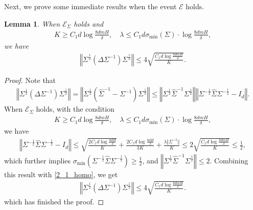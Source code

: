\documentclass{article}
\newtheorem{lemma}{Lemma}[section]
\numberwithin{equation}{section}
\begin{document}
Next, we prove some immediate results when the event $\mathcal{E}$ holds. 
\begin{lemma}
\label{dsig2_homo}
When $\mathcal{E}_\Sigma$ holds and 
\begin{align*}
    K\geq C_1d\log\frac{8dmH}{\delta},\quad\lambda\leq C_1d\sigma_{\textrm{min}}(\Sigma)\cdot\log\frac{8dmH}{\delta},
\end{align*}
we have
\begin{align*}
        \left\Vert\Sigma^{\frac{1}{2}}\left(\Delta\Sigma^{-1}\right)\Sigma^{\frac{1}{2}}\right\Vert\leq 4\sqrt{\frac{C_1d\log\frac{8dmH}{\delta}}{K}}. 
\end{align*}
\end{lemma}
\begin{proof}
Note that
\begin{align}
    \label{2_1_homo}
    \left\Vert\Sigma^{\frac{1}{2}}\left(\Delta\Sigma^{-1}\right)\Sigma^{\frac{1}{2}}\right\Vert=\left\Vert\Sigma^{\frac{1}{2}}\left(\widehat{\Sigma}^{-1}-\Sigma^{-1}\right)\Sigma^{\frac{1}{2}}\right\Vert\leq\left\Vert\Sigma^{\frac{1}{2}}\widehat{\Sigma}^{-1}\Sigma^{\frac{1}{2}}\right\Vert\left\Vert\Sigma^{-\frac{1}{2}}\widehat{\Sigma}\Sigma^{-\frac{1}{2}}-I_d\right\Vert.  
\end{align}
When $\mathcal{E}_\Sigma$ holds, with the condition
\begin{align*}
    K\geq C_1d\log\frac{8dmH}{\delta},\quad\lambda\leq C_1d\sigma_{\textrm{min}}(\Sigma)\cdot\log\frac{8dmH}{\delta},
\end{align*}
we have
\begin{align*}
\left\Vert\Sigma^{-\frac{1}{2}}\widehat{\Sigma}\Sigma^{-\frac{1}{2}}-I_d\right\Vert\leq \sqrt{\frac{2C_1d\log\frac{8dH}{\delta}}{K}}+\frac{2C_1d\log\frac{8dH}{\delta}}{3K}+\frac{\lambda\Vert\Sigma^{-1}\Vert}{K}\leq 2\sqrt{\frac{C_1d\log\frac{8dmH}{\delta}}{K}}\leq \frac{1}{2},
\end{align*}
which further implies $\sigma_{\textrm{min}}\left(\Sigma^{-\frac{1}{2}}\widehat{\Sigma}\Sigma^{-\frac{1}{2}}\right)\geq\frac{1}{2}$, and $\left\Vert\Sigma^{\frac{1}{2}}\widehat{\Sigma}^{-1}\Sigma^{\frac{1}{2}}\right\Vert\leq 2$. Combining this result with \eqref{2_1_homo}, we get 
\begin{align*}
    \left\Vert\Sigma^{\frac{1}{2}}\left(\Delta\Sigma^{-1}\right)\Sigma^{\frac{1}{2}}\right\Vert\leq 4\sqrt{\frac{C_1d\log\frac{8dmH}{\delta}}{K}}.
\end{align*}
which has finished the proof. 
\end{proof}
\end{document}
